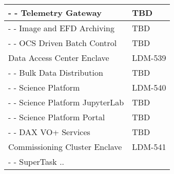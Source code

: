\begin{longtable}{|p{}|p{}|}
- - Telemetry Gateway & TBD \\ \hline
- - Image and EFD Archiving & TBD \\ \hline
- - OCS Driven Batch Control & TBD \\ \hline
\rowcolor{orange}
Data Access Center Enclave & LDM-539 \\ \hline
- - Bulk Data Distribution & TBD \\ \hline
\rowcolor{yellow}
- - Science Platform & LDM-540 \\ \hline
- - Science Platform JupyterLab & TBD \\ \hline
- - Science Platform Portal & TBD \\ \hline
- - DAX VO+ Services & TBD \\ \hline
\rowcolor{orange}
Commissioning Cluster Enclave & LDM-541 \\ \hline
- - SuperTask .. &  \\ \hline
\end{longtable}
